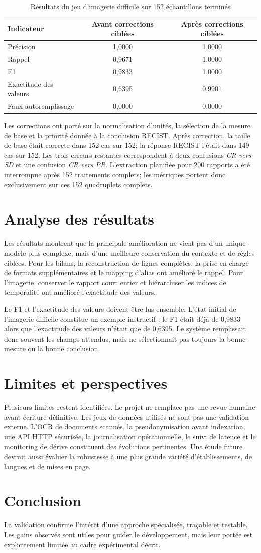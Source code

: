 \begin{table}[H]
\centering
\caption{Résultats du jeu d'imagerie difficile sur 152 échantillons terminés}
\begin{tabular}{lcc}
\toprule
Indicateur & Avant corrections ciblées & Après corrections ciblées\\
\midrule
Précision & 1,0000 & 1,0000\\
Rappel & 0,9671 & 1,0000\\
F1 & 0,9833 & 1,0000\\
Exactitude des valeurs & 0,6395 & 0,9901\\
Faux autoremplissage & 0,0000 & 0,0000\\
\bottomrule
\end{tabular}
\end{table}

Les corrections ont porté sur la normalisation d'unités, la sélection de la mesure de base et la priorité donnée à la conclusion RECIST. Après correction, la taille de base était correcte dans 152 cas sur 152; la réponse RECIST l'était dans 149 cas sur 152. Les trois erreurs restantes correspondent à deux confusions \emph{CR vers SD} et une confusion \emph{CR vers PR}. L'extraction planifiée pour 200 rapports a été interrompue après 152 traitements complets; les métriques portent donc exclusivement sur ces 152 quadruplets complets.

\section{Analyse des résultats}
Les résultats montrent que la principale amélioration ne vient pas d'un unique modèle plus complexe, mais d'une meilleure conservation du contexte et de règles ciblées. Pour les bilans, la reconstruction de lignes complètes, la prise en charge de formats supplémentaires et le mapping d'alias ont amélioré le rappel. Pour l'imagerie, conserver le rapport court entier et hiérarchiser les indices de temporalité ont amélioré l'exactitude des valeurs.

Le F1 et l'exactitude des valeurs doivent être lus ensemble. L'état initial de l'imagerie difficile constitue un exemple instructif : le F1 était déjà de 0,9833 alors que l'exactitude des valeurs n'était que de 0,6395. Le système remplissait donc souvent les champs attendus, mais ne sélectionnait pas toujours la bonne mesure ou la bonne conclusion.

\section{Limites et perspectives}
Plusieurs limites restent identifiées. Le projet ne remplace pas une revue humaine avant écriture définitive. Les jeux de données utilisés ne sont pas une validation externe. L'OCR de documents scannés, la pseudonymisation avant indexation, une API HTTP sécurisée, la journalisation opérationnelle, le suivi de latence et le monitoring de dérive constituent des évolutions pertinentes. Une étude future devrait aussi évaluer la robustesse à une plus grande variété d'établissements, de langues et de mises en page.

\section{Conclusion}
La validation confirme l'intérêt d'une approche spécialisée, traçable et testable. Les gains observés sont utiles pour guider le développement, mais leur portée est explicitement limitée au cadre expérimental décrit.
